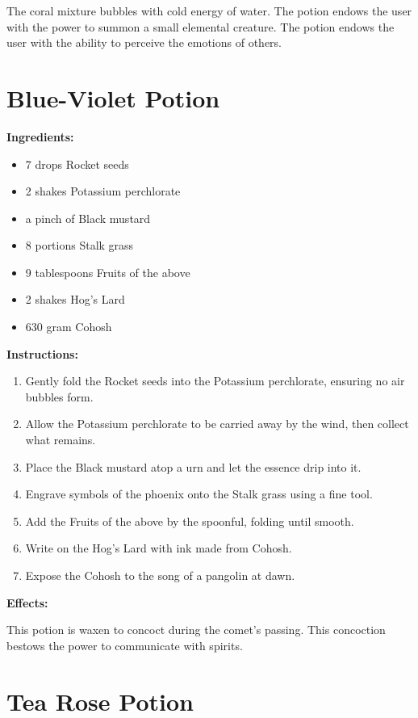 \documentclass{article}
\begin{document}
The coral mixture bubbles with cold energy of water. The potion endows the user with the power to summon a small elemental creature. The potion endows the user with the ability to perceive the emotions of others.

\newpage
\section*{Blue-Violet Potion}

\textbf{Ingredients:}

\begin{itemize}
  \item 7 drops Rocket seeds
  \item 2 shakes Potassium perchlorate
  \item a pinch of Black mustard
  \item 8 portions Stalk grass
  \item 9 tablespoons Fruits of the above
  \item 2 shakes Hog's Lard
  \item 630 gram Cohosh
\end{itemize}

\textbf{Instructions:}

\begin{enumerate}
  \item Gently fold the Rocket seeds into the Potassium perchlorate, ensuring no air bubbles form.
  \item Allow the Potassium perchlorate to be carried away by the wind, then collect what remains.
  \item Place the Black mustard atop a urn and let the essence drip into it.
  \item Engrave symbols of the phoenix onto the Stalk grass using a fine tool.
  \item Add the Fruits of the above by the spoonful, folding until smooth.
  \item Write on the Hog's Lard with ink made from Cohosh.
  \item Expose the Cohosh to the song of a pangolin at dawn.
\end{enumerate}

\textbf{Effects:}

This potion is waxen to concoct during the comet’s passing. This concoction bestows the power to communicate with spirits.

\newpage
\section*{Tea Rose Potion}
\end{document}
